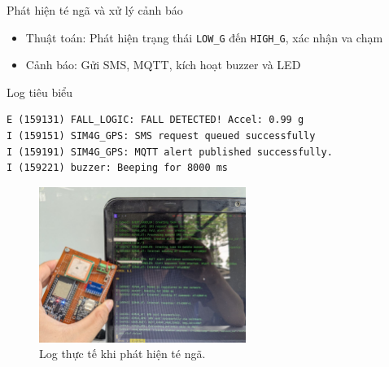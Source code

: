 \begin{frame}[fragile]{Phát hiện té ngã và xử lý cảnh báo}
    \begin{itemize}
        \item Thuật toán: Phát hiện trạng thái \texttt{LOW_G} đến \texttt{HIGH_G}, xác nhận va chạm
        \item Cảnh báo: Gửi SMS, MQTT, kích hoạt buzzer và LED
    \end{itemize}
    \begin{block}{Log tiêu biểu}
        \begin{verbatim}
E (159131) FALL_LOGIC: FALL DETECTED! Accel: 0.99 g
I (159151) SIM4G_GPS: SMS request queued successfully
I (159191) SIM4G_GPS: MQTT alert published successfully.
I (159221) buzzer: Beeping for 8000 ms
        \end{verbatim}
    \end{block}
    \begin{figure}
        \centering
        \includegraphics[width=0.6\textwidth]{images/module1_real_log.jpg}
        \caption{Log thực tế khi phát hiện té ngã.}
    \end{figure}
\end{frame}

